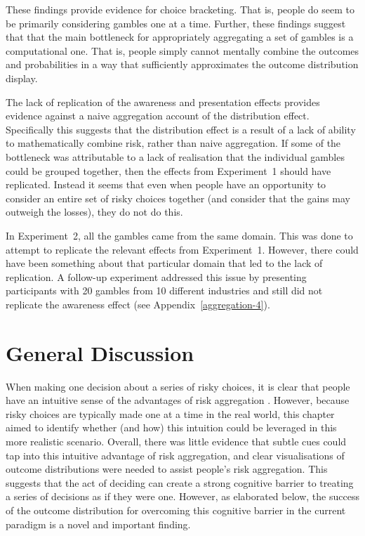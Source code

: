 \documentclass[a4paper, nobind]{templates/ociamthesis}
\theoremstyle{definition}
\theoremstyle{definition}
\theoremstyle{definition}
\theoremstyle{definition}
\theoremstyle{remark}
\begin{document}
These findings provide evidence for choice bracketing. That is, people do seem
to be primarily considering gambles one at a time. Further, these findings
suggest that that the main bottleneck for appropriately aggregating a set of
gambles is a computational one. That is, people simply cannot mentally combine
the outcomes and probabilities in a way that sufficiently approximates the
outcome distribution display.

The lack of replication of the awareness and presentation effects provides
evidence against a naive aggregation account of the distribution effect.
Specifically this suggests that the distribution effect is a result of a lack of
ability to mathematically combine risk, rather than naive aggregation. If some
of the bottleneck was attributable to a lack of realisation that the individual
gambles could be grouped together, then the effects from Experiment~1 should
have replicated. Instead it seems that even when people have an opportunity to
consider an entire set of risky choices together (and consider that the gains
may outweigh the losses), they do not do this.

In Experiment~2, all the gambles came from the same domain. This was done to
attempt to replicate the relevant effects from Experiment~1. However, there
could have been something about that particular domain that led to the lack of
replication. A follow-up experiment addressed this issue by presenting
participants with 20 gambles from 10 different industries and still did not
replicate the awareness effect (see Appendix~\ref{aggregation-4}).

\section{General Discussion}

When making one decision about a series of risky choices, it is clear that
people have an intuitive sense of the advantages of risk aggregation \autocite[e.g.,][]{samuelson1963}. However, because risky choices are typically made one at a time
in the real world, this chapter aimed to identify whether (and how) this
intuition could be leveraged in this more realistic scenario. Overall, there was
little evidence that subtle cues could tap into this intuitive advantage of risk
aggregation, and clear visualisations of outcome distributions were needed to
assist people's risk aggregation. This suggests that the act of deciding can
create a strong cognitive barrier to treating a series of decisions as if they
were one. However, as elaborated below, the success of the outcome distribution
for overcoming this cognitive barrier in the current paradigm is a novel and
important finding.
\end{document}
